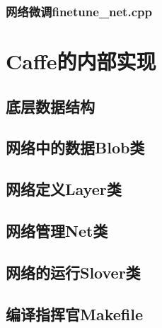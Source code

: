 \documentclass{NanCNBook}
\begin{document}
\section{网络微调finetune\_net.cpp}

\part{Caffe的内部实现}
\chapter{底层数据结构}

\chapter{网络中的数据Blob类}

\chapter{网络定义Layer类}

\chapter{网络管理Net类}

\chapter{网络的运行Slover类}



\begin{cnappendix}
\chapter{编译指挥官Makefile}

\end{cnappendix}
\end{document}
